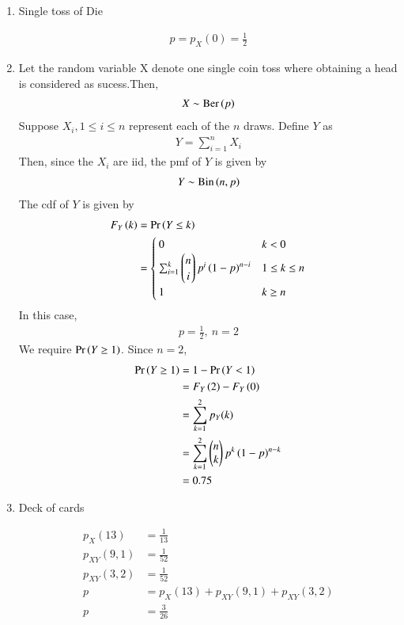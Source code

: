 \documentclass[journal,12pt,onecolumn]{IEEEtran}
\theoremstyle{remark}
\begin{document}
\begin{enumerate}[label={(\alph*)}]
	\item \begin{table}[!htb]
	
	\caption{Single toss of Die}	
\end{table}
\begin{align}
	p = p_{X}(0) = \frac{1}{2}
\end{align}

\item Let the random variable X denote one single coin toss where obtaining a head is considered as sucess.Then,\\
   \begin{align}
        X \sim \textrm{Ber}\left(p\right)
  \end{align}
  Suppose $X_i, 1\le i\le n$ represent each of the $n$ draws. Define $Y$ as
    \begin{align}
        Y = \sum_{i=1}^nX_i
    \end{align}
    Then, since the $X_i$ are iid, the pmf of $Y$ is given by
    \begin{align}
        Y \sim \textrm{Bin}\left(n,p\right)
    \end{align}
    The cdf of $Y$ is given by
    \begin{align}
    F_Y\left(k\right) &= \Pr\left(Y \le k\right) \\
                    &=
        \begin{cases}
            0 & k < 0 \\
            \sum_{i=1}^{k}\begin{pmatrix}n\\i\end{pmatrix}p^i\left(1-p\right)^{n-i} & 1 \le k \le n \\
            1 & k \ge n
        \end{cases}
    \end{align}
    In this case,
    \begin{align}
        p = \frac{1}{2},\ n = 2
    \end{align}
    We require $\Pr\left(Y\ge1\right)$. Since $n = 2$,
             \begin{align}
                \Pr\left(Y\ge1\right) &= 1 - \Pr\left(Y<1\right) \\
                           &= F_Y\left(2\right) - F_Y\left(0\right) \\
                           &= \sum_{k=1}^{2}p_Y(k) \\
                           &= \sum_{k=1}^{2}\begin{pmatrix}n\\k\end{pmatrix}p^k\left(1-p\right)^{n-k} \\
                           &= 0.75
            \end{align}
\item \begin{table}[!htb]
	
	\caption{Deck of cards}
\end{table} 
\begin{align}
	p_{X}(13) &= \frac{1}{13}\\
	p_{XY}(9,1) &= \frac{1}{52}\\
	p_{XY}(3,2) &= \frac{1}{52}\\
	p &= p_{X}(13) + p_{XY}(9,1) + p_{XY}(3,2)\\
	p &= \frac{3}{26}
\end{align}


\end{enumerate}
\end{document}
